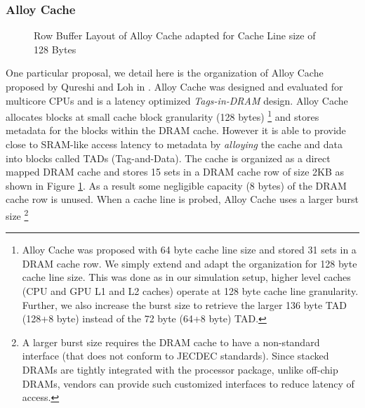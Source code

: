 \subsubsection{Alloy Cache} \label{alloy-background}
\begin{figure}[!htb]
	\centering
	\def\svgwidth{\columnwidth}
	
	\caption{Row Buffer Layout of Alloy Cache adapted for Cache Line size of 128 Bytes}
	\label{fig:dramcache-rb}
\end{figure}
\par One particular proposal, we detail here is the organization of Alloy Cache proposed by Qureshi and Loh in \cite{alloy}. Alloy Cache was designed and evaluated for multicore CPUs and is a latency optimized \textit{Tags-in-DRAM} design. Alloy Cache allocates blocks at small cache block granularity (128 bytes)
\footnote{Alloy Cache was proposed with 64 byte cache line size and stored 31 sets in a DRAM cache row. We simply extend and adapt the organization for 128 byte cache line size. This was done as in our simulation setup, higher level caches (CPU and GPU L1 and L2 caches) operate at 128 byte cache line granularity. Further, we also increase the burst size to retrieve the larger 136 byte TAD (128+8 byte) instead of the 72 byte (64+8 byte) TAD.} 
and stores metadata for the blocks within the DRAM cache. However it is able to provide close to SRAM-like access latency to metadata by \textit{alloying} the cache and data into blocks called TADs (Tag-and-Data). The cache is organized as a direct mapped DRAM cache and stores 15 sets in a DRAM cache row of size 2KB as shown in Figure \ref{fig:dramcache-rb}. As a result some negligible capacity (8 bytes) of the DRAM cache row is unused. When a cache line is probed, Alloy Cache uses a larger burst size
\footnote{A larger burst size requires the DRAM cache to have a non-standard interface (that does not conform to JECDEC standards). Since stacked DRAMs are tightly integrated with the processor package, unlike off-chip DRAMs, vendors can provide such customized interfaces to reduce latency of access.}
